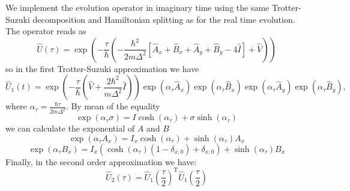 We implement the evolution operator in imaginary time using the same Trotter-Suzuki decomposition and Hamiltonian splitting as for the real time evolution. The operator reads as
\begin{equation}
\hat{U}(\tau) =   \exp\left(-\frac{\tau}{\hbar} \left( -\frac{\hbar^2}{2 m \Delta^2} \left[ \hat{A}_x + \hat{B}_x + \hat{A}_y + \hat{B}_y - 4 \hat{I} \right] + \hat{V} \right) \right)
\end{equation} 
so in the first Trotter-Suzuki approximation we have
\begin{equation}
\hat{U}_1(t) = \exp\left(-\frac{\tau}{\hbar}\left(\hat{V} + \frac{2 \hbar^2}{m \Delta^2} \hat{I}\right) \right) \exp\left(\alpha_\tau \hat{A}_x \right) \exp\left( \alpha_\tau \hat{B}_x \right) \exp\left( \alpha_\tau \hat{A}_y \right) \exp\left( \alpha_\tau \hat{B}_y \right),
\end{equation}
where $\alpha_\tau = \frac{\hbar \tau}{2m\Delta^2}$. By mean of the equality
\begin{equation}
\exp( \alpha_\tau \sigma) = I \cosh(\alpha_\tau) +  \sigma \sinh(\alpha_\tau)
\end{equation}
we can calculate the exponential of $A$ and $B$
\begin{equation}
\exp\left( \alpha_\tau A_x \right) = I_x \cosh(\alpha_\tau) + \sinh(\alpha_\tau) A_x
\end{equation}
\begin{equation}
\exp\left( \alpha_\tau B_x \right) = I_x (\cosh(\alpha_\tau)(1-\delta_{x,0}) + \delta_{x,0}) +  \sinh(\alpha_\tau) B_x
\end{equation}
Finally, in the second order approximation we have:
\begin{equation}
\hat{U}_2(\tau) = \hat{U}_1\left( \frac{\tau}{2} \right)^\mathrm{T} \hat{U}_1\left(\frac{\tau}{2}\right)
\end{equation}

